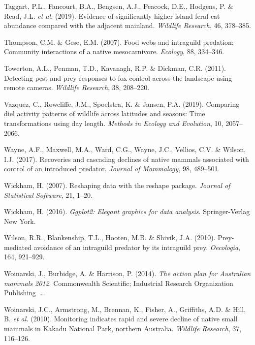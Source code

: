 \documentclass[11pt,a4paper,titlepage,twoside,openright]{style/unimelbthesis}
\begin{document}
\begin{mainmatter}
\leavevmode\hypertarget{ref-taggart2019evidence}{}%
Taggart, P.L., Fancourt, B.A., Bengsen, A.J., Peacock, D.E., Hodgens, P. \& Read, J.L. \emph{et al.} (2019). Evidence of significantly higher island feral cat abundance compared with the adjacent mainland. \emph{Wildlife Research}, 46, 378--385.

\leavevmode\hypertarget{ref-thompson2007food}{}%
Thompson, C.M. \& Gese, E.M. (2007). Food webs and intraguild predation: Community interactions of a native mesocarnivore. \emph{Ecology}, 88, 334--346.

\leavevmode\hypertarget{ref-towerton2011detecting}{}%
Towerton, A.L., Penman, T.D., Kavanagh, R.P. \& Dickman, C.R. (2011). Detecting pest and prey responses to fox control across the landscape using remote cameras. \emph{Wildlife Research}, 38, 208--220.

\leavevmode\hypertarget{ref-vazquez2019comparing}{}%
Vazquez, C., Rowcliffe, J.M., Spoelstra, K. \& Jansen, P.A. (2019). Comparing diel activity patterns of wildlife across latitudes and seasons: Time transformations using day length. \emph{Methods in Ecology and Evolution}, 10, 2057--2066.

\leavevmode\hypertarget{ref-wayne2017recoveries}{}%
Wayne, A.F., Maxwell, M.A., Ward, C.G., Wayne, J.C., Vellios, C.V. \& Wilson, I.J. (2017). Recoveries and cascading declines of native mammals associated with control of an introduced predator. \emph{Journal of Mammalogy}, 98, 489--501.

\leavevmode\hypertarget{ref-reshape}{}%
Wickham, H. (2007). Reshaping data with the reshape package. \emph{Journal of Statistical Software}, 21, 1--20.

\leavevmode\hypertarget{ref-ggplot2}{}%
Wickham, H. (2016). \emph{Ggplot2: Elegant graphics for data analysis}. Springer-Verlag New York.

\leavevmode\hypertarget{ref-wilson2010prey}{}%
Wilson, R.R., Blankenship, T.L., Hooten, M.B. \& Shivik, J.A. (2010). Prey-mediated avoidance of an intraguild predator by its intraguild prey. \emph{Oecologia}, 164, 921--929.

\leavevmode\hypertarget{ref-woinarski2014action}{}%
Woinarski, J., Burbidge, A. \& Harrison, P. (2014). \emph{The action plan for Australian mammals 2012}. Commonwealth Scientific; Industrial Research Organization Publishing~\ldots.

\leavevmode\hypertarget{ref-woinarski2010monitoring}{}%
Woinarski, J.C., Armstrong, M., Brennan, K., Fisher, A., Griffiths, A.D. \& Hill, B. \emph{et al.} (2010). Monitoring indicates rapid and severe decline of native small mammals in Kakadu National Park, northern Australia. \emph{Wildlife Research}, 37, 116--126.


\end{mainmatter}
\end{document}
